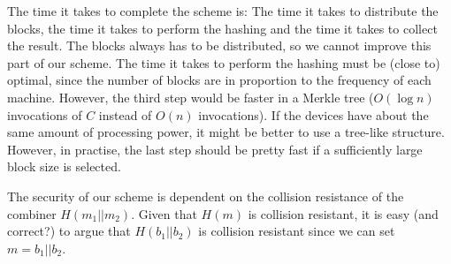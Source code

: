 \documentclass{article}
\begin{document}
The time it takes to complete the scheme is: The time it takes to distribute the blocks, the time it takes to perform the hashing and the time it takes to collect the result. The blocks always has to be distributed, so we cannot improve this part of our scheme. The time it takes to perform the hashing must be (close to) optimal, since the number of blocks are in proportion to the frequency of each machine. However, the third step would be faster in a Merkle tree ($O(\log n)$ invocations of $C$ instead of $O(n)$ invocations). If the devices have about the same amount of processing power, it might be better to use a tree-like structure. However, in practise, the last step should be pretty fast if a sufficiently large block size is selected.

The security of our scheme is dependent on the collision resistance of the combiner $H(m_1 || m_2)$. Given that $H(m)$ is collision resistant, it is easy (and correct?) to argue that $H(b_1||b_2)$ is collision resistant since we can set $m=b_1||b_2$.
\end{document}

